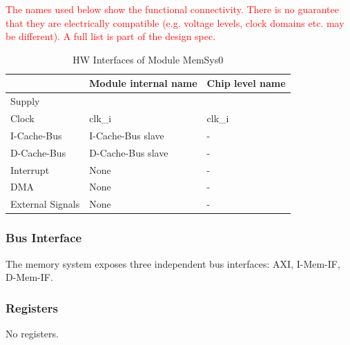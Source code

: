 \textcolor{red}{The names used below show the functional connectivity. There is no guarantee that they are electrically compatible (e.g. voltage levels, clock domains etc. may be different). A full list is part of the design spec.}
\begin{table}[H]
\caption{HW Interfaces of Module MemSys0}
\label{tab:asMemSys02}
\centering
\begin{tabularx}{\textwidth}{|l |l |X|}
  \hline
   & Module internal name & Chip level name \\
  \hline
  \hline
  Supply &  &  \\
  \hline
  Clock & clk\_i & clk\_i \\
  \hline
  I-Cache-Bus  & I-Cache-Bus slave & - \\
  \hline
  D-Cache-Bus  & D-Cache-Bus slave & - \\
  \hline
  Interrupt & None &  - \\
  \hline
  DMA & None & - \\
  \hline
  External Signals & None & - \\
  \hline
\end{tabularx}
\end{table}

\subsubsection{Bus Interface}
The memory system  exposes three independent bus interfaces: AXI, I-Mem-IF, D-Mem-IF.


\subsubsection{Registers}
No registers.

